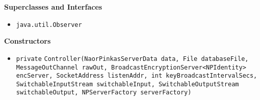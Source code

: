 \textbf{\sffamily Superclasses and Interfaces}
\begin{itemize}
\item \lstinline|java.util.Observer|
\end{itemize}


\textbf{\sffamily Constructors}
\begin{itemize}
\item \lstinline|private| \lstinline|Controller|\lstinline|(NaorPinkasServerData data, File databaseFile, MessageOutChannel rawOut, BroadcastEncryptionServer<NPIdentity> encServer, SocketAddress listenAddr, int keyBroadcastIntervalSecs, SwitchableInputStream switchableInput, SwitchableOutputStream switchableOutput, NPServerFactory serverFactory)| \\[-0.6em]




\end{itemize}


